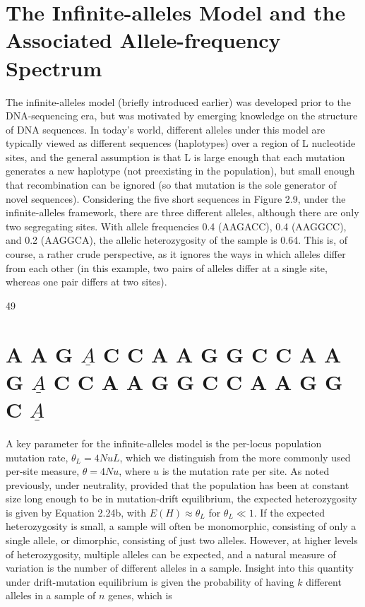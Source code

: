 \documentclass{article}
\begin{document}
\section{The Infinite-alleles Model and the Associated Allele-frequency Spectrum}
The infinite-alleles model (briefly introduced earlier) was developed prior to the DNA-sequencing era, but was motivated by emerging knowledge on the structure of DNA sequences. In today's world, different alleles under this model are typically viewed as different sequences (haplotypes) over a region of L nucleotide sites, and the general assumption is that L is large enough that each mutation generates a new haplotype (not preexisting in the population), but small enough that recombination can be ignored (so that mutation is the sole generator of novel sequences). Considering the five short sequences in Figure 2.9, under the infinite-alleles framework, there are three different alleles, although there are only two segregating sites. With allele frequencies 0.4 (AAGACC), 0.4 (AAGGCC), and 0.2 (AAGGCA), the allelic heterozygosity of the sample is 0.64. This is, of course, a rather crude perspective, as it ignores the ways in which alleles differ from each other (in this example, two pairs of alleles differ at a single site, whereas one pair differs at two sites).

49

\section{A A G  $ \underline{A} $ C C
A A G G C C
A A G  $ \underline{A} $ C C
A A G G C C
A A G G C  $ \underline{A} $}
A key parameter for the infinite-alleles model is the per-locus population mutation rate,  $ \theta_L = 4NuL $, which we distinguish from the more commonly used per-site measure,  $ \theta = 4Nu $, where  $ u $ is the mutation rate per site. As noted previously, under neutrality, provided that the population has been at constant size long enough to be in mutation-drift equilibrium, the expected heterozygosity is given by Equation 2.24b, with  $ E(H) \approx \theta_L $ for  $ \theta_L \ll 1 $. If the expected heterozygosity is small, a sample will often be monomorphic, consisting of only a single allele, or dimorphic, consisting of just two alleles. However, at higher levels of heterozygosity, multiple alleles can be expected, and a natural measure of variation is the number of different alleles in a sample. Insight into this quantity under drift-mutation equilibrium is given the probability of having  $ k $ different alleles in a sample of  $ n $ genes, which is
\end{document}
